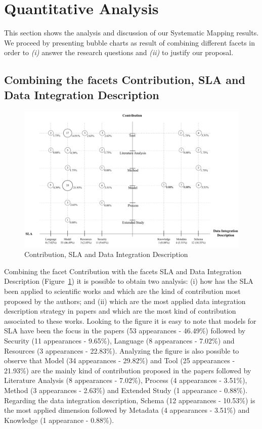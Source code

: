 \section{Quantitative Analysis}

This section shows the analysis and discussion of our Systematic Mapping results.
We proceed by presenting bubble charts as result of combining different facets in order to 
\textit{(i)} answer the research questions and \textit{(ii)} to justify our proposal.


\subsection{Combining the facets Contribution, SLA and Data Integration Description}

\begin{figure}[h!]
\centering
\includegraphics[scale=0.45]{figs/bubble-charts/Contribution-SLA-DIdescription.pdf} 
\caption{Contribution, SLA and Data Integration Description}\label{fig:facet1}
\end{figure}

Combining the facet Contribution with the facets SLA and Data Integration Description 
(Figure~\ref{fig:facet1}) it is possible to obtain two analysis: 
(i) how has the SLA been applied to scientific works and which are the kind of contribution 
most proposed by the authors; and (ii) which are the most applied data integration description
strategy in papers and which are the most kind of contribution associated to these works. 
Looking to the figure it is easy to note that models for SLA have been the focus in the papers 
(53 appearances - 46.49\%) followed by Security (11 appearances - 9.65\%), Language 
(8 appearances - 7.02\%) and Resources (3 appearances - 22.83\%).
Analyzing the figure is also possible to observe that Model (34 appearances - 29.82\%) and 
Tool (25 appearances - 21.93\%) are the mainly kind of contribution proposed in the papers 
followed by Literature Analysis (8 appearances - 7.02\%), Process (4 appearances - 3.51\%), 
Method (3 appearances - 2.63\%) and Extended Study (1 appearance - 0.88\%).
Regarding the data integration description, Schema (12 appearances - 10.53\%) is the most 
applied dimension followed by Metadata (4 appearances - 3.51\%) and Knowledge (1 appearance - 0.88\%).

